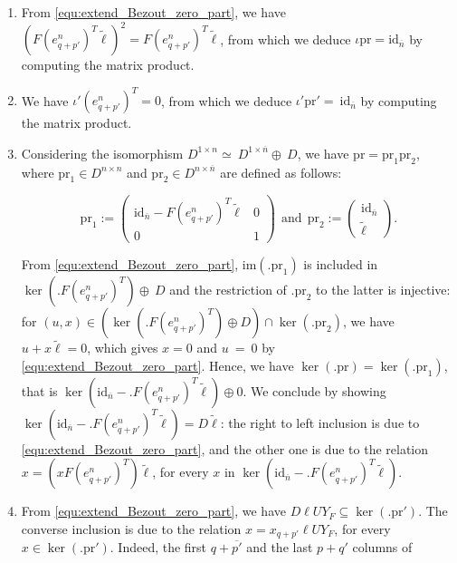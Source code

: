 \documentclass{ifacconf}
\newcommand\id[1]{\text{id}_{#1}}
\newcommand\im{\text{im}}
\newcommand\p{\text{pr}}
\begin{document}
\begin{pf}
  \begin{enumerate}
  \item From \eqref{equ:extend_Bezout_zero_part}, we have
    $\left(F(e^n_{q+p'})^T\tilde{\ell}\right)^2=F(e^{n}_{q+p'})^T
    \tilde{\ell}$, from which we deduce $\iota\p=\id{\overline{n}}$ by
    computing the matrix product.
  \item We have $\iota'(e^n_{q+p'})^T=0$, from which we deduce
    $\iota'\p'=~\id{\overline{n}}$ by computing the matrix product.
  \item Considering the isomorphism
    $D^{1\times n}\simeq~D^{1\times\overline{n}}\oplus~D$, we have
    $\p=\p_1\p_2$, where $\p_1\in D^{n\times n}$ and
    $\p_2\in D^{n\times \overline{n}}$ are defined as follows:
    \medskip
    \begin{small}
      \[\p_1:=\begin{pmatrix}
      \id{\overline{n}}-F(e^{n}_{q+p'})^T\tilde{\ell} & 0\\
      0 & 1
      \end{pmatrix}\ \ \text{and}\ \
      \p_2:=\begin{pmatrix}
      \id{\overline{n}}\\
      \tilde{\ell}
      \end{pmatrix}.\]
    \end{small}
    \medskip
    From \eqref{equ:extend_Bezout_zero_part}, $\im(.\p_1)$ is included in
    $\ker(.F(e^{n}_{q+p'})^T)\oplus~D$ and the restriction of $.\p_2$ to
    the latter is injective: for $(u,x)\in\left(\ker(.F(e^{n}_{q+p'})^T)
    \oplus D\right)\cap\ker(.\p_2)$, we have $u+x\tilde{\ell}=0$, which
    gives $x=0$ and $u~=~0$ by \eqref{equ:extend_Bezout_zero_part}. Hence, we
    have $\ker(.\p)=\ker(.\p_1)$, that is
    $\ker\left(\id{\overline{n}}-.F(e^{n}_{q+p'})^T\tilde{\ell}\right)
    \oplus 0$. We conclude by showing $\ker
    \left(\id{\overline{n}}- .F(e^{n}_{q+p'})^T\tilde{\ell}\right)=D
    \tilde{\ell}$: the right to left inclusion is due to
    \eqref{equ:extend_Bezout_zero_part}, and the other one is due to the
    relation $x=\left(xF(e^n_{q+p'})^T\right)\tilde{\ell}$, for every $x$
    in $\ker\left(\id{\overline{n}}-.F(e^n_{q+p'})^T\tilde{\ell}\right)$.
  \item From \eqref{equ:extend_Bezout_zero_part}, we have 
    $D\ell UY_F\subseteq\ker(.\p')$. The converse inclusion is due to
    the relation $x=x_{q+p'}\ell UY_F$, for every $x\in\ker(.\p')$.
    Indeed, the first $q+\overline{p'}$ and the last $p+q'$ columns of

\end{enumerate}
\end{pf}
\end{document}
